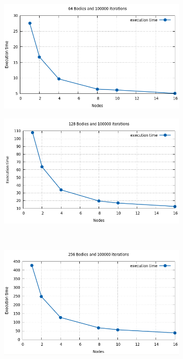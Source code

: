 \documentclass[a4paper]{article}
\begin{document}
\begin{figure}[ht]
\begin{subfigure}{.5\textwidth}
  \centering
  \includegraphics[width=1\linewidth]{results/graph3}
\end{subfigure} %
\begin{subfigure}{.5\textwidth}
  \centering
  \includegraphics[width=1\linewidth]{results/graph4}
\end{subfigure} \\ %
\begin{subfigure}{.5\textwidth}
  \centering
  \includegraphics[width=1\linewidth]{results/graph5}

\end{subfigure}
\end{figure}
\end{document}
